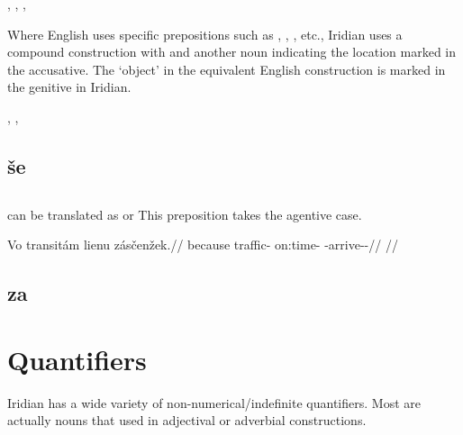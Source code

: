 \pex
\a {}, 
\a {}, 
\a {}, 
\xe

Where English uses specific prepositions such as , , , etc., Iridian uses a compound construction with  and another noun indicating the location marked in the accusative. The `object' in the equivalent English construction is marked in the genitive in Iridian.

\pex
\a {}, 
\a {}, 
\xe

\subsection{še}

\subsection{}

 can be translated as  or  This preposition takes the agentive case.

\pex
\begingl
\gla Vo transitám lienu zásčenžek.//
\glb because traffic-\Agt{} on:time-\Ins{} \Neg{}-arrive-\Av{}-\Pf{}//
\glft {}//
\endgl
\xe

\subsection{za}

\section{Quantifiers}
Iridian has a wide variety of non-numerical/indefinite quantifiers.  Most are actually nouns that used in adjectival or adverbial constructions.


